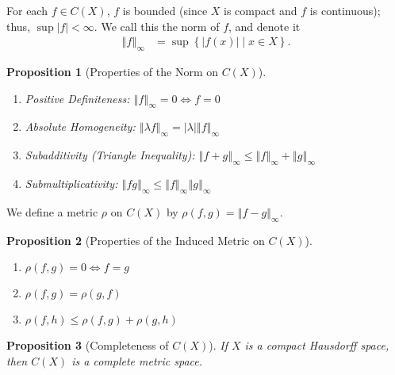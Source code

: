 \documentclass[12pt]{extarticle}
\newcommand{\norm}[1]{\left\Vert #1\right\Vert}
\newcommand{\set}[1]{\left\{#1\right\}}
\theoremstyle{plain}
\newtheorem*{proposition}{Proposition}
\theoremstyle{definition}
\theoremstyle{note}
\begin{document}
For each $f\in C(X)$, $f$ is bounded (since $X$ is compact and $f$ is continuous); thus, $\sup\left\vert f \right\vert < \infty$. We call this the norm of $f$, and denote it
\begin{align*}
  \norm{f}_{\infty} &= \sup\set{|f(x)|\mid x\in X}.
\end{align*}
\begin{proposition}[Properties of the Norm on $C(X)$]\hfill
  \begin{enumerate}[(1)]
    \item Positive Definiteness: $\displaystyle \norm{f}_{\infty} = 0 \Leftrightarrow f = 0$
    \item Absolute Homogeneity: $\displaystyle \norm{\lambda f}_{\infty} = |\lambda|\norm{f}_{\infty}$
    \item Subadditivity (Triangle Inequality): $\displaystyle \norm{f+g}_{\infty}\leq \norm{f}_{\infty} + \norm{g}_{\infty}$
    \item Submultiplicativity: $\displaystyle \norm{fg}_{\infty} \leq \norm{f}_{\infty} \norm{g}_{\infty}$
  \end{enumerate}
\end{proposition}
We define a metric $\rho$ on $C(X)$ by $\rho(f,g) = \norm{f-g}_{\infty}$.
\begin{proposition}[Properties of the Induced Metric on $C(X)$]\hfill
  \begin{enumerate}[(1)]
    \item $\displaystyle \rho(f,g) = 0 \Leftrightarrow f=g$
    \item $\displaystyle \rho(f,g) = \rho(g,f)$
    \item $\displaystyle \rho(f,h) \leq \rho(f,g) + \rho(g,h)$
  \end{enumerate}
\end{proposition}
\begin{proposition}[Completeness of $C(X)$]
  If $X$ is a compact Hausdorff space, then $C(X)$ is a complete metric space.
\end{proposition}
\end{document}
